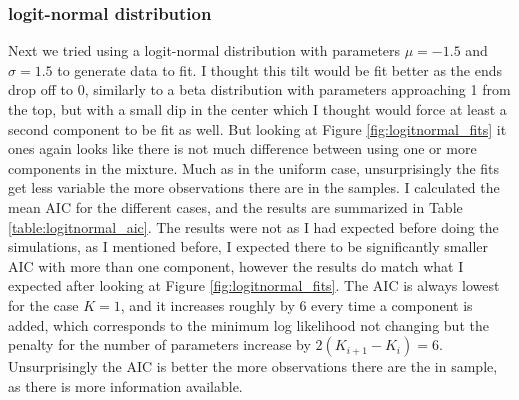 \subsubsection{logit-normal distribution}
Next we tried using a logit-normal distribution with parameters $\mu=-1.5$ and $\sigma=1.5$ to generate data to fit. I thought this tilt would be fit better as the ends drop off to 0, similarly to a beta distribution with parameters approaching 1 from the top, but with a small dip in the center which I thought would force at least a second component to be fit as well. But looking at Figure \ref{fig:logitnormal_fits} it ones again looks like there is not much difference between using one or more components in the mixture. Much as in the uniform case, unsurprisingly the fits get less variable the more observations there are in the samples.
I calculated the mean AIC for the different cases, and the results are summarized in Table \ref{table:logitnormal_aic}. The results were not as I had expected before doing the simulations, as I mentioned before, I expected there to be significantly smaller AIC with more than one component, however the results do match what I expected after looking at Figure \ref{fig:logitnormal_fits}. The AIC is always lowest for the case $K=1$, and it increases roughly by 6 every time a component is added, which corresponds to the minimum log likelihood not changing but the penalty for the number of parameters increase by $2(K_{i+1}-K_i)=6$. Unsurprisingly the AIC is better the more observations there are the in sample, as there is more information available.




